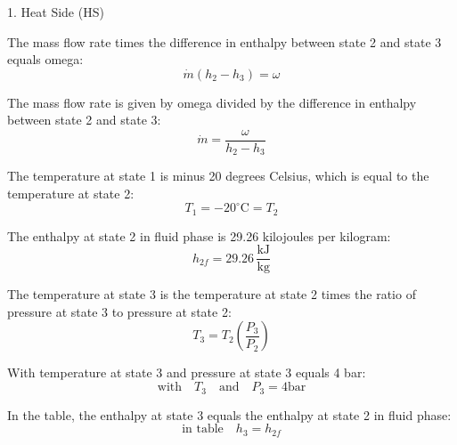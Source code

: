 1. Heat Side (HS)

The mass flow rate times the difference in enthalpy between state 2 and state 3 equals omega:
\[ \dot{m} (h_2 - h_3) = \omega \]

The mass flow rate is given by omega divided by the difference in enthalpy between state 2 and state 3:
\[ \dot{m} = \frac{\omega}{h_2 - h_3} \]

The temperature at state 1 is minus 20 degrees Celsius, which is equal to the temperature at state 2:
\[ T_1 = -20^\circ \text{C} = T_2 \]

The enthalpy at state 2 in fluid phase is 29.26 kilojoules per kilogram:
\[ h_{2f} = 29.26 \, \frac{\text{kJ}}{\text{kg}} \]

The temperature at state 3 is the temperature at state 2 times the ratio of pressure at state 3 to pressure at state 2:
\[ T_3 = T_2 \left( \frac{P_3}{P_2} \right) \]

With temperature at state 3 and pressure at state 3 equals 4 bar:
\[ \text{with} \quad T_3 \quad \text{and} \quad P_3 = 4 \text{bar} \]

In the table, the enthalpy at state 3 equals the enthalpy at state 2 in fluid phase:
\[ \text{in table} \quad h_3 = h_{2f} \]